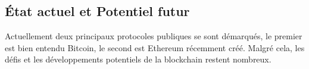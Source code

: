 \documentclass{tnreport}
\begin{document}


\subsection{État actuel et Potentiel futur}

Actuellement deux principaux protocoles publiques se sont démarqués, le premier est bien entendu Bitcoin, le second est Ethereum récemment créé. Malgré cela, les défis et les développements potentiels de la blockchain restent nombreux.
\end{document}
